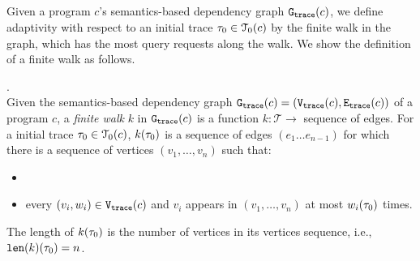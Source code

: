 \subsection{}
Given 
a program $c$'s semantics-based dependency graph 
$\mathtt{{G_{trace}}}({c})$,
we define adaptivity 
with respect to an initial trace $\mathtt{\tau}_0 \in \mathcal{T}_0(c)$ by the finite walk in the graph, which has the most query requests along the walk.
We show the definition of a finite walk as follows.
%
  \begin{defn}.
  \label{def:finitewalk}
  \\
  Given the semantics-based dependency graph $\mathtt{{G_{trace}}}({c}) = (\mathtt{{V_{trace}}}({c}), \mathtt{{E_{trace}}}({c}))$ of a program $c$,
  a \emph{finite walk} $k$ in $\mathtt{{G_{trace}}}({c})$ is a 
  function $k: \mathcal{T} \to $ sequence of edges.
  For a initial trace $\mathtt{\tau}_0 \in \mathcal{T}_0(c)$, 
  $k(\mathtt{\tau}_0)$ is a sequence of edges $(e_1 \ldots e_{n - 1})$ 
  for which there is a sequence of vertices 
  $(v_1, \ldots, v_{n})$ such that:
  \begin{itemize}
      \item {}
      \item every $(v_i, w_i) \in \mathtt{{V_{trace}}}(c)$
       and $v_i$ appears in $(v_1, \ldots, v_{n})$ at most 
    $w_i(\mathtt{\tau}_0)$
      times.  
  \end{itemize}
  The length of $k(\mathtt{\tau}_0)$ is the number of vertices in its vertices sequence, i.e., $\mathtt{len}(k)(\mathtt{\tau}_0) = n$.
 \end{defn}

